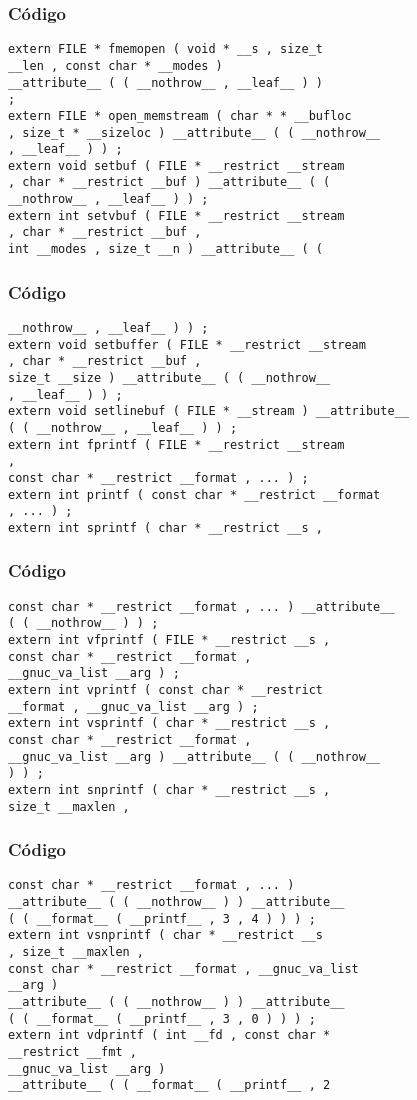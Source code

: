 \documentclass{beamer}
\begin{document}
\begin{frame}[fragile]
\frametitle{C\'odigo}
\begin{verbatim}
extern FILE * fmemopen ( void * __s , size_t 
__len , const char * __modes ) 
__attribute__ ( ( __nothrow__ , __leaf__ ) ) 
; 
extern FILE * open_memstream ( char * * __bufloc 
, size_t * __sizeloc ) __attribute__ ( ( __nothrow__ 
, __leaf__ ) ) ; 
extern void setbuf ( FILE * __restrict __stream 
, char * __restrict __buf ) __attribute__ ( ( 
__nothrow__ , __leaf__ ) ) ; 
extern int setvbuf ( FILE * __restrict __stream 
, char * __restrict __buf , 
int __modes , size_t __n ) __attribute__ ( ( 
\end{verbatim}
\end{frame}
\begin{frame}[fragile]
\frametitle{C\'odigo}
\begin{verbatim}
__nothrow__ , __leaf__ ) ) ; 
extern void setbuffer ( FILE * __restrict __stream 
, char * __restrict __buf , 
size_t __size ) __attribute__ ( ( __nothrow__ 
, __leaf__ ) ) ; 
extern void setlinebuf ( FILE * __stream ) __attribute__ 
( ( __nothrow__ , __leaf__ ) ) ; 
extern int fprintf ( FILE * __restrict __stream 
, 
const char * __restrict __format , ... ) ; 
extern int printf ( const char * __restrict __format 
, ... ) ; 
extern int sprintf ( char * __restrict __s , 
\end{verbatim}
\end{frame}
\begin{frame}[fragile]
\frametitle{C\'odigo}
\begin{verbatim}
const char * __restrict __format , ... ) __attribute__ 
( ( __nothrow__ ) ) ; 
extern int vfprintf ( FILE * __restrict __s , 
const char * __restrict __format , 
__gnuc_va_list __arg ) ; 
extern int vprintf ( const char * __restrict 
__format , __gnuc_va_list __arg ) ; 
extern int vsprintf ( char * __restrict __s , 
const char * __restrict __format , 
__gnuc_va_list __arg ) __attribute__ ( ( __nothrow__ 
) ) ; 
extern int snprintf ( char * __restrict __s , 
size_t __maxlen , 
\end{verbatim}
\end{frame}
\begin{frame}[fragile]
\frametitle{C\'odigo}
\begin{verbatim}
const char * __restrict __format , ... ) 
__attribute__ ( ( __nothrow__ ) ) __attribute__ 
( ( __format__ ( __printf__ , 3 , 4 ) ) ) ; 
extern int vsnprintf ( char * __restrict __s 
, size_t __maxlen , 
const char * __restrict __format , __gnuc_va_list 
__arg ) 
__attribute__ ( ( __nothrow__ ) ) __attribute__ 
( ( __format__ ( __printf__ , 3 , 0 ) ) ) ; 
extern int vdprintf ( int __fd , const char * 
__restrict __fmt , 
__gnuc_va_list __arg ) 
__attribute__ ( ( __format__ ( __printf__ , 2 
\end{verbatim}
\end{frame}
\end{document}
